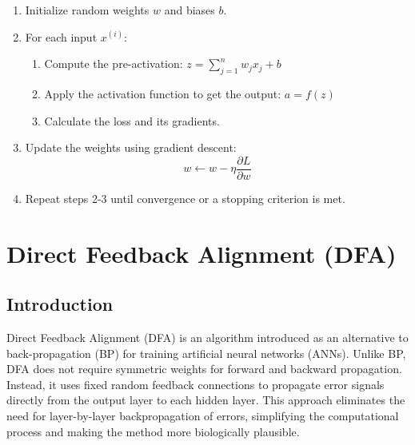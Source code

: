 \documentclass[english]{article}
\begin{document}
\begin{enumerate}
    \item Initialize random weights \( w \) and biases \( b \).
    \item For each input \( x^{(i)} \):
        \begin{enumerate}
            \item Compute the pre-activation: \( z = \sum_{j=1}^{n} w_j x_j + b \)
            \item Apply the activation function to get the output: \( a = f(z) \)
            \item Calculate the loss and its gradients.
        \end{enumerate}
    \item Update the weights using gradient descent:
\begin{equation}
    w \leftarrow w - \eta \frac{\partial L}{\partial w}
\end{equation}

    \item Repeat steps 2-3 until convergence or a stopping criterion is met.
\end{enumerate}






















\section{Direct Feedback Alignment (DFA)}

\subsection{Introduction}
Direct Feedback Alignment\cite{2016arXiv160901596N} (DFA) is an algorithm introduced as an alternative to back-propagation (BP) for training artificial neural networks (ANNs). Unlike BP, DFA does not require symmetric weights for forward and backward propagation. Instead, it uses fixed random feedback connections to propagate error signals directly from the output layer to each hidden layer. This approach eliminates the need for layer-by-layer backpropagation of errors, simplifying the computational process and making the method more biologically plausible.
\end{document}
